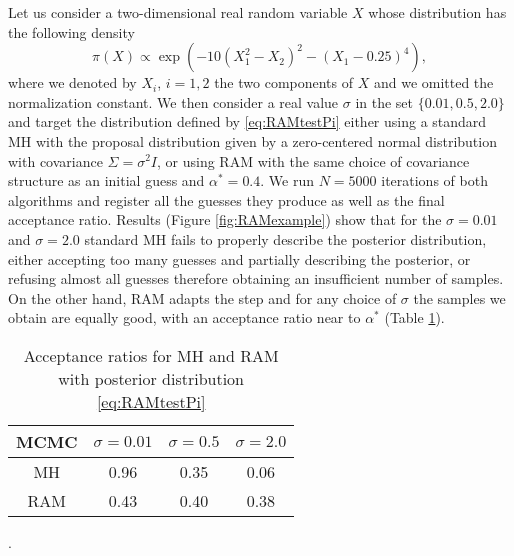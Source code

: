 Let us consider a two-dimensional real random variable $X$ whose distribution has the following density
\begin{equation}\label{eq:RAMtestPi}
	\pi(X) \propto \exp(-10(X_1^2 - X_2)^2 - (X_1 - 0.25)^4),
\end{equation}
where we denoted by $X_i$, $i = 1, 2$ the two components of $X$ and we omitted the normalization constant. We then consider a real value $\sigma$ in the set $\{0.01, 0.5, 2.0\}$ and target the distribution defined by \eqref{eq:RAMtestPi} either using a standard MH with the proposal distribution given by a zero-centered normal distribution with covariance $\Sigma = \sigma^2 I$, or using RAM with the same choice of covariance structure as an initial guess and $\alpha^* = 0.4$. We run $N = 5000$ iterations of both algorithms and register all the guesses they produce as well as the final acceptance ratio. Results (Figure \ref{fig:RAMexample}) show that for the $\sigma = 0.01$ and $\sigma = 2.0$ standard MH fails to properly describe the posterior distribution, either accepting too many guesses and partially describing the posterior, or refusing almost all guesses therefore obtaining an insufficient number of samples. On the other hand, RAM adapts the step and for any choice of $\sigma$ the samples we obtain are equally good, with an acceptance ratio near to $\alpha^*$ (Table \ref{tab:RAMalphaStar}).

\begin{table}[H]
	\centering
	\begin{tabular}{cccc}
		\toprule
		MCMC & $\sigma = 0.01$ & $\sigma = 0.5$ & $\sigma = 2.0$ \\ 
		\midrule
		MH & 0.96  & 0.35  & 0.06  \\
		RAM & 0.43 & 0.40 & 0.38 \\
		\bottomrule
	\end{tabular}
	\caption{Acceptance ratios for MH and RAM with posterior distribution \eqref{eq:RAMtestPi}}.
	\label{tab:RAMalphaStar}
\end{table}



